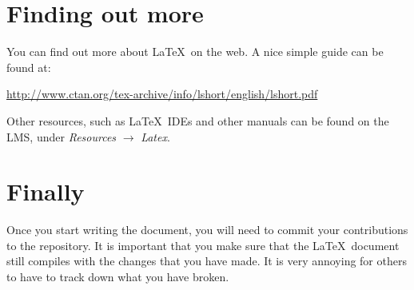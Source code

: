 \section{Finding out more} 
\label{sec:more}

You can find out more about \LaTeX~on the web. A nice simple guide can
be found at:

\url{http://www.ctan.org/tex-archive/info/lshort/english/lshort.pdf}

Other resources, such as \LaTeX\ IDEs and other manuals can be found
on the LMS, under {\em Resources} $\rightarrow$ {\em Latex}.

\section{Finally}

Once you start writing the document, you will need to commit your
contributions to the repository. It is important that you make sure
that the \LaTeX~document still compiles with the changes that you have
made. It is very annoying for others to have to track down what you
have broken.
